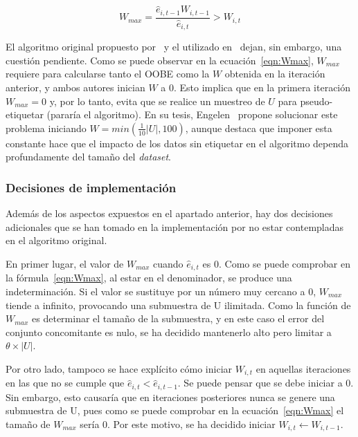 \begin{equation}\label{eqn:Wmax} W_{max} = \frac{\hat{e}_{i,t-1}W_{i,t-1}}{\hat{e}_{i, t}} > W_{i,t} \end{equation}


\label{parag:Wmax_inicial} El algoritmo original propuesto por~\cite{originalCoForest2007} y el utilizado en~\cite{zhou2021SemisupervisedRecommendationAttack} dejan, sin embargo, una cuestión pendiente. Como se puede observar en la ecuación~\ref{eqn:Wmax}, $W_{max}$ requiere para calcularse tanto el OOBE como la $W$ obtenida en la iteración anterior, y ambos autores inician $W$ a 0. Esto implica que en la primera iteración $W_{max} = 0$ y, por lo tanto, evita que se realice un muestreo de $U$ para pseudo-etiquetar (pararía el algoritmo). En su tesis, Engelen~\cite{engelen2018thesis} propone solucionar este problema iniciando $W = min(\frac{1}{10}|U|, 100)$, aunque destaca que imponer esta constante hace que el impacto de los datos sin etiquetar en el algoritmo dependa profundamente del tamaño del \textit{dataset}.


\subsubsection{Decisiones de implementación}

Además de los aspectos expuestos en el apartado anterior, hay dos decisiones adicionales que se han tomado en la implementación por no estar contempladas en el algoritmo original.

En primer lugar, el valor de $W_{max}$ cuando $\hat{e}_{i, t}$  es $0$. Como se puede comprobar en la fórmula~\ref{eqn:Wmax}, al estar en el denominador, se produce una indeterminación. Si el valor se sustituye por un número muy cercano a 0, $W_{max}$ tiende a infinito, provocando una submuestra de U ilimitada. Como la función de $W_{max}$ es determinar el tamaño de la submuestra, y en este caso el error del conjunto concomitante es nulo, se ha decidido mantenerlo alto pero limitar a $\theta\times|U|$.

Por otro lado, tampoco se hace explícito cómo iniciar $W_{i,t}$ en aquellas iteraciones en las que no se cumple que $\hat{e}_{i,t} < \hat{e}_{i,t-1}$. Se puede pensar que se debe iniciar a 0. Sin embargo, esto causaría que en iteraciones posteriores nunca se genere una submuestra de U, pues como se puede comprobar en la ecuación~\ref{eqn:Wmax} el tamaño de $W_{max}$ sería $0$. Por este motivo, se ha decidido iniciar $W_{i,t} \leftarrow W_{i,t-1}$.








